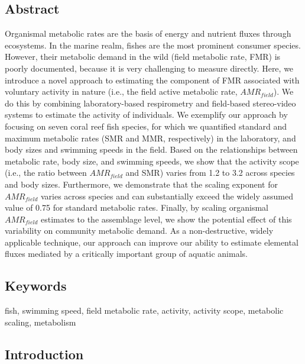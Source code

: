 \documentclass[
]{article}
\begin{document}
\hypertarget{abstract}{%
\subsection{Abstract}\label{abstract}}

Organismal metabolic rates are the basis of energy and nutrient fluxes
through ecosystems. In the marine realm, fishes are the most prominent
consumer species. However, their metabolic demand in the wild (field
metabolic rate, FMR) is poorly documented, because it is very
challenging to measure directly. Here, we introduce a novel approach to
estimating the component of FMR associated with voluntary activity in
nature (i.e., the field active metabolic rate, \(AMR_{field}\)). We do
this by combining laboratory-based respirometry and field-based
stereo-video systems to estimate the activity of individuals. We
exemplify our approach by focusing on seven coral reef fish species, for
which we quantified standard and maximum metabolic rates (SMR and MMR,
respectively) in the laboratory, and body sizes and swimming speeds in
the field. Based on the relationships between metabolic rate, body size,
and swimming speeds, we show that the activity scope (i.e., the ratio
between \(AMR_{field}\) and SMR) varies from 1.2 to 3.2 across species
and body sizes. Furthermore, we demonstrate that the scaling exponent
for \(AMR_{field}\) varies across species and can substantially exceed
the widely assumed value of 0.75 for standard metabolic rates. Finally,
by scaling organismal \(AMR_{field}\) estimates to the assemblage level,
we show the potential effect of this variability on community metabolic
demand. As a non-destructive, widely applicable technique, our approach
can improve our ability to estimate elemental fluxes mediated by a
critically important group of aquatic animals.

\hypertarget{keywords}{%
\subsection{Keywords}\label{keywords}}

fish, swimming speed, field metabolic rate, activity, activity scope,
metabolic scaling, metabolism

\hypertarget{introduction}{%
\subsection{Introduction}\label{introduction}}
\end{document}
